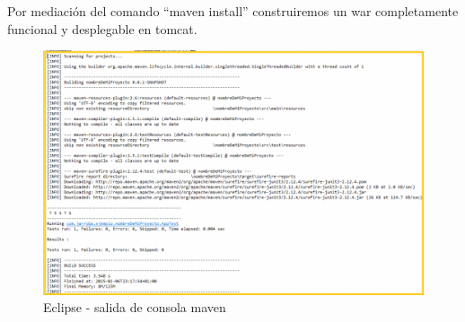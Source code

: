 Por mediación del comando “maven install” construiremos un war completamente funcional y desplegable en tomcat. 

\begin{figure}[H]
	\centering
	\includegraphics[width=0.7\linewidth]{figuras/maven/maven3}
	\caption{Eclipse - salida de consola maven}
	\label{fig:mvn3}
\end{figure}


